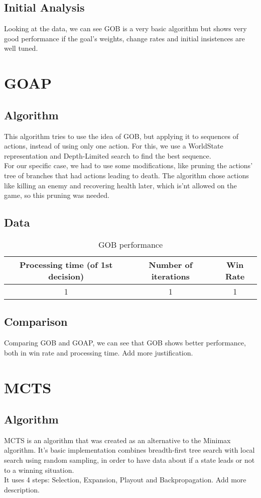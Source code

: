 \documentclass{article}
\begin{document}
  \subsection{Initial Analysis}
  Looking at the data, we can see GOB is a very basic algorithm but shows very good performance if the goal's weights, change rates and initial insistences are well tuned.\\
  
  \section{GOAP}
  \subsection{Algorithm}
  This algorithm tries to use the idea of GOB, but applying it to sequences of actions, instead of using only one action. For this, we use a WorldState representation 
  and Depth-Limited search to find the best sequence.\\
  For our specific case, we had to use some modifications, like pruning the actions' tree of branches that had actions leading to death. The algorithm chose actions like killing
  an enemy and recovering health later, which is'nt allowed on the game, so this pruning was needed.
  \subsection{Data}
  \begin{table}[h!]
    \centering
    \caption{GOB performance}
    \label{tab:tableGOB1}
    \begin{tabular}{c|c|c}
      \textbf{Processing time (of 1st decision)} & \textbf{Number of iterations} & \textbf{Win Rate}\\
      \hline
      1 & 1 & 1
    \end{tabular}
  \end{table}
  \subsection{Comparison}
  Comparing GOB and GOAP, we can see that GOB shows better performance, both in win rate and processing time. Add more justification.
  
  \section{MCTS}
  \subsection{Algorithm}
  MCTS is an algorithm that was created as an alternative to the Minimax algorithm. It's basic implementation combines breadth-first tree search with local search using
  random sampling, in order to have data about if a state leads or not to a winning situation.\\
   It uses 4 steps: Selection, Expansion, Playout and Backpropagation. Add more description.
  
\end{document}
